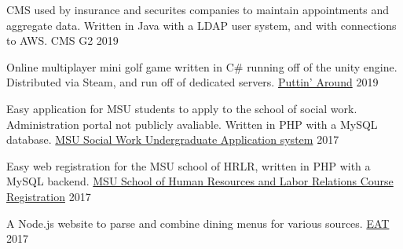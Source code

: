 
\begin{cventries}
  \cventry
  {CMS used by insurance and securites companies to maintain appointments and aggregate data.
  Written in Java with a LDAP user system, and with connections to AWS.}
  {CMS G2}
  {}
  {2019}
  {
  }

  \cventry
    {Online multiplayer mini golf game written in C\# running off of the unity engine. Distributed via Steam,
    and run off of dedicated servers.}
    {\href{https://store.steampowered.com/app/1002650/Puttin_Around/}{Puttin' Around}}
    {}
    {2019}
    {
    }

    \cventry
    {Easy application for MSU students to apply to the school of social work. Administration portal not publicly avaliable.
    Written in PHP with a MySQL database.}
    {\href{https://swdb.socialwork.msu.edu/basw/}{MSU Social Work Undergraduate Application system}}
    {}
    {2017}
    {
    }

    \cventry
    {Easy web registration for the MSU school of HRLR, written in PHP with a MySQL backend. }
    {\href{https://hrlr.msu.edu/registration/login.php}{MSU School of Human Resources and Labor Relations Course Registration}}
    {}
    {2017}
    {
    }

  \cventry
    {A Node.js website to parse and combine dining menus for various sources.}
    {\href{https://github.com/oonis/eat}{EAT}}
    {}
    {2017}
    {
    }



\end{cventries}

